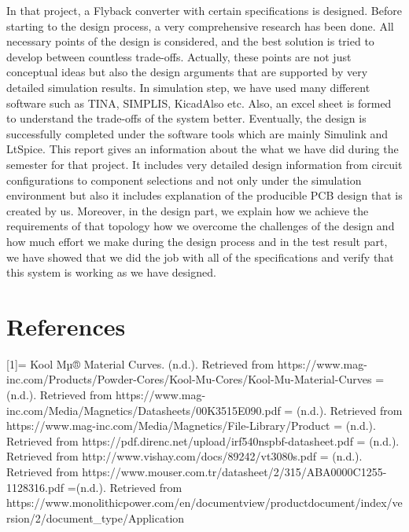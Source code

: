 \documentclass{article}
\begin{document}
In that project, a Flyback converter with certain speciﬁcations is designed. Before starting to the design process, a very comprehensive research has been done. All necessary points of the design is considered, and the best solution is tried to develop between countless trade-oﬀs. Actually, these points are not just conceptual ideas but also the design arguments that are supported by very detailed simulation results. In simulation step, we have used many different software such as TINA, SIMPLIS, KicadAlso etc. Also, an excel sheet is formed to understand the trade-oﬀs of the system better. Eventually, the design is successfully completed under the software tools which are mainly Simulink and LtSpice. This report gives an information about the what we have did during the semester for that project. It includes very detailed design information from circuit configurations to component selections and not only under the simulation environment but also  it includes explanation of the producible PCB design that is created by us. Moreover, in the design part, we explain how we achieve the requirements of that topology how we overcome the challenges of the design and how much effort we make during the design process  and in the test result part, we have showed that we did the job with all of the specifications and verify that this system is working as we have designed.

\section{References}

[1]= Kool Mµ® Material Curves. (n.d.). Retrieved from https://www.mag-inc.com/Products/Powder-Cores/Kool-Mu-Cores/Kool-Mu-Material-Curves
\newline
[2]= (n.d.). Retrieved from https://www.mag-inc.com/Media/Magnetics/Datasheets/00K3515E090.pdf 
\newline
[3]= (n.d.). Retrieved from https://www.mag-inc.com/Media/Magnetics/File-Library/Product%
\newline
[4]= (n.d.). Retrieved from https://pdf.direnc.net/upload/irf540nspbf-datasheet.pdf
\newline
[5]= (n.d.). Retrieved from http://www.vishay.com/docs/89242/vt3080s.pdf
\newline
[6]= (n.d.). Retrieved from https://www.mouser.com.tr/datasheet/2/315/ABA0000C1255-1128316.pdf
\newline
[7]=(n.d.). Retrieved from https://www.monolithicpower.com/en/documentview/productdocument/index/version/2/document_type/Application%
\end{document}
